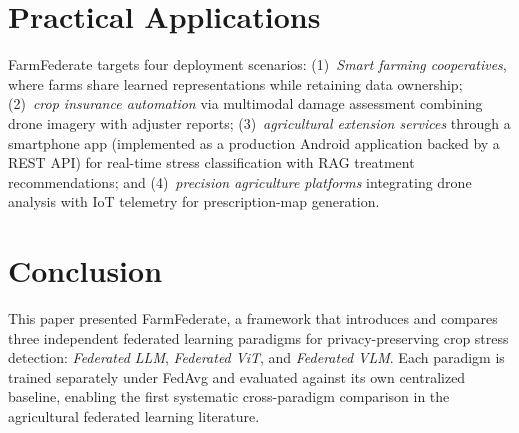 \documentclass[10pt,journal,compsoc]{IEEEtran}
\begin{document}
\section{Practical Applications}
\label{sec:usecase}

FarmFederate targets four deployment scenarios: (1)~\textit{Smart farming cooperatives}, where farms share learned representations while retaining data ownership; (2)~\textit{crop insurance automation} via multimodal damage assessment combining drone imagery with adjuster reports; (3)~\textit{agricultural extension services} through a smartphone app (implemented as a production Android application backed by a REST API) for real-time stress classification with RAG treatment recommendations; and (4)~\textit{precision agriculture platforms} integrating drone analysis with IoT telemetry for prescription-map generation.

\section{Conclusion}
\label{sec:conclusion}

This paper presented FarmFederate, a framework that introduces and compares three independent federated learning paradigms for privacy-preserving crop stress detection: \textit{Federated LLM}, \textit{Federated ViT}, and \textit{Federated VLM}. Each paradigm is trained separately under FedAvg and evaluated against its own centralized baseline, enabling the first systematic cross-paradigm comparison in the agricultural federated learning literature.
\end{document}
